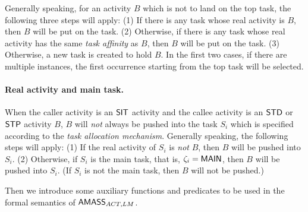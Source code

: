 Generally speaking, for an activity $B$  which is not to land on the top task, %
the following three steps will apply: (1) If there is any task whose real activity is $B$, then $B$ will be put on the task. %
(2) Otherwise, if there is any task whose real activity has the same \emph{task affinity} as $B$, then $B$ will be put on the task. %
(3) Otherwise, a new task is created to hold $B$. In the first two cases, if there are multiple instances, the first occurrence starting from the top task will be selected. 

\paragraph{Real activity and main task.}
When the caller activity is an ${\sf SIT}$ activity and the callee activity is an ${\sf STD}$ or ${\sf STP}$ activity $B$, $B$ will \emph{not} always be pushed into the task $S_i$ which is specified according to the \emph{task allocation mechanism}. Generally speaking, the following steps will apply: (1) If the real activity of $S_i$ is \emph{not} $B$, then $B$ will be pushed into $S_i$. (2) Otherwise, if $S_i$ is the main task, that is, $\zeta_i={\sf MAIN}$, then $B$ will be pushed into $S_i$. (If $S_i$ is not the main task, then $B$ will not be pushed.)

\smallskip

Then we introduce some auxiliary functions and predicates to be used in the formal semantics of $\textsf{AMASS}_{ACT,LM}$.

